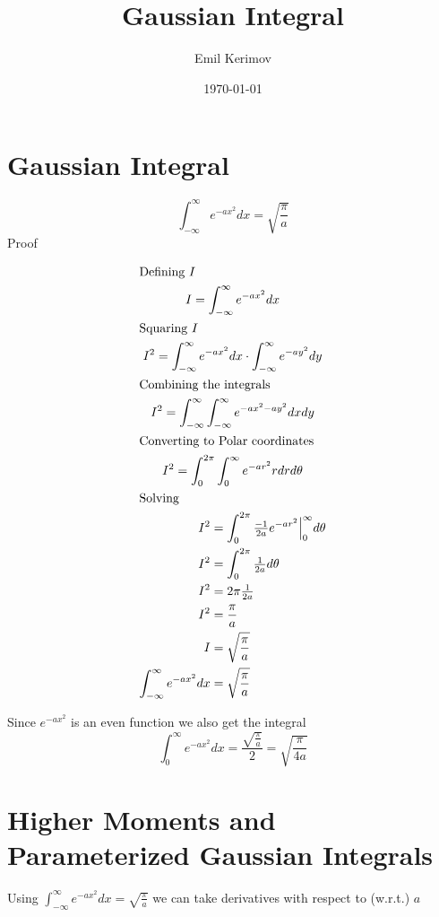 \documentclass[a4paper]{article}
\title{Gaussian Integral}
\author{Emil Kerimov}
\date{\today}
\begin{document}
\maketitle

\section{Gaussian Integral} 

\begin{theorem}
$$
\int_{-\infty}^{\infty}{e^{-ax^2}}dx = \sqrt{\frac{\pi}{a}}
$$
Proof

\begin{gather*}
\shortintertext{Defining $I$}
I = \int_{-\infty}^{\infty}{e^{-ax^2}}dx\\
\shortintertext{Squaring $I$}
I^2 = \int_{-\infty}^{\infty}{e^{-ax^2}}dx \cdot \int_{-\infty}^{\infty}{e^{-ay^2}}dy\\
\shortintertext{Combining the integrals}
I^2 = \int_{-\infty}^{\infty} \int_{-\infty}^{\infty}{e^{-ax^2 - ay^2}}dx dy\\
\shortintertext{Converting to Polar coordinates}
I^2 = \int_{0}^{2 \pi} \int_{0}^{\infty}{e^{-ar^2}}rdr d\theta\\
\shortintertext{Solving}
\begin{alignedat}{2}
I^2 &= \int_{0}^{2 \pi} \tfrac{-1}{2a} e^{-ar^2} \Big|_0^{\infty} d\theta \\
I^2 &= \int_{0}^{2 \pi} \tfrac{1}{2a} d\theta \\
I^2 &= 2 \pi \tfrac{1}{2a} \\
I^2 &= \frac{\pi}{a} \\
I &= \sqrt{\frac{\pi}{a}} \\
\int_{-\infty}^{\infty}{e^{-ax^2}}dx &= \sqrt{\frac{\pi}{a}} \\
\end{alignedat}
\end{gather*}
\end{theorem}

Since $e^{-ax^2}$ is an even function we also get the integral
\begin{equation}
\int_{0}^{\infty}{e^{-ax^2}}dx = \frac{\sqrt{\frac{\pi}{a}}}{2} = \sqrt{\frac{\pi}{4a}} 
\end{equation}

\section{Higher Moments and Parameterized Gaussian Integrals}\label{gi:sec:parameterized-integrals} 
Using $
\int_{-\infty}^{\infty}{e^{-ax^2}}dx = \sqrt{\frac{\pi}{a}}
$ we can take derivatives with respect to (w.r.t.) $a$
 
\end{document}
